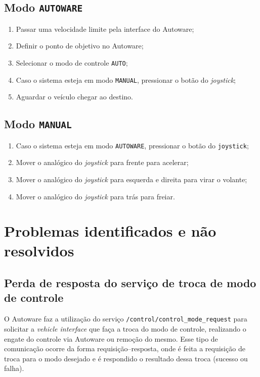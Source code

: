 \subsection{Modo \texttt{AUTOWARE}}

\begin{enumerate}
	\item Passar uma velocidade limite pela interface do Autoware;
	\item Definir o ponto de objetivo no Autoware;
	\item Selecionar o modo de controle \texttt{AUTO};
	\item Caso o sistema esteja em modo \texttt{MANUAL}, pressionar o botão do \textit{joystick};
	\item Aguardar o veículo chegar ao destino.
\end{enumerate}

\subsection{Modo \texttt{MANUAL}}

\begin{enumerate}
	\item Caso o sistema esteja em modo \texttt{AUTOWARE}, pressionar o botão do \texttt{joystick};
	\item Mover o analógico do \textit{joystick} para frente para acelerar;
	\item Mover o analógico do \textit{joystick} para esquerda e direita para virar o volante;
	\item Mover o analógico do \textit{joystick} para trás para freiar.
\end{enumerate}

\clearpage


\section{Problemas identificados e não resolvidos}

\subsection*{Perda de resposta do serviço de troca de modo de controle}

O Autoware faz a utilização do serviço \texttt{/control/control\_mode\_request} para solicitar a \textit{vehicle interface} que faça a troca do modo de controle, realizando o engate do controle via Autoware ou remoção do mesmo. Esse tipo de comunicação ocorre da forma requisição--resposta, onde é feita a requisição de troca para o modo desejado e é respondido o resultado dessa troca (sucesso ou falha). 

